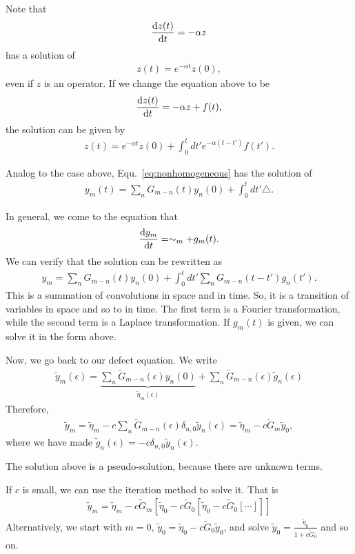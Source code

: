 Note that 
\begin{align}
\frac{{\mathrm d} {z(t)}}{{\mathrm d}t}=-\alpha z
\end{align}
has a solution of 
\begin{align}
z(t)= e^{-\alpha t}z(0),
\end{align}
even if $ z $ is an operator. If we change the equation above to be
\begin{align}
\frac{{\mathrm d} {z(t)}}{{\mathrm d}t}=-\alpha z +f(t),
\end{align}
the solution can be given by
\begin{align}
z(t)= e^{-\alpha t}z(0) +\int_0^t dt' e^{-\alpha (t-t')} f(t').
\end{align}

Analog to the case above, Equ.~\ref{eq:nonhomogeneous} has the solution of
\begin{align}
y_m(t)= \sum_n G_{m-n}(t)y_n (0) + \int_0^t dt' \triangle .
\end{align}

In general, we come to the equation that
\begin{align}
\frac{{\mathrm d} {y_m}}{{\mathrm d}t} = \sim_m +g_m (t).
\end{align}
We can verify that the solution can be rewritten as
\begin{align}
y_m =\sum_n G_{m-n}(t) y_n(0) + \int_0^t dt' \sum_n G_{m-n}(t-t') g_n (t'). 
\end{align}
This is a summation of convolutions in space and in time. So, it is a transition of variables in space and so to in time. The first term is a Fourier transformation, while the second term is a Laplace transformation. 
If $ g_m (t) $ is given, we can solve it in the form above. 

Now, we go back to our defect equation. We write
\begin{align}
\tilde{y}_m (\epsilon)= \underbrace{\sum_{n} \tilde{G} _{m-n }(\epsilon) y_n (0)}_{\tilde{\eta}_m(\epsilon)} + \sum_n \tilde{G}_{m-n}(\epsilon) \tilde{g}_n(\epsilon)
\end{align}
Therefore,
\begin{align}
\tilde{y}_m= \tilde{\eta}_m -c \sum_n \tilde{G}_{m-n}(\epsilon) \delta_{n,0} \tilde{y}_n (\epsilon)=\tilde{\eta}_m-c\tilde{G}_m\tilde{y}_0,
\end{align}
where we have made $ \tilde{g}_n(\epsilon)=-c\delta_{n,0}\tilde{y}_n(\epsilon) $.

The solution above is a pseudo-solution, because there are unknown terms. 

If $ c $ is small, we can use the iteration method to solve it. That is
\begin{align}
\tilde{y}_m=\tilde{\eta}_m-c\tilde{G}_m[\tilde{\eta}_0-c\tilde{G}_0[\tilde{\eta}_0-c\tilde{G}_0[\cdots]]]
\end{align}
Alternatively, we start with $ m=0 $, $\tilde{y}_0=\tilde{\eta}_0-c\tilde{G}_0\tilde{y}_0  $, and solve $ \tilde{y}_0=\frac{\tilde{\eta}_0}{1+c\tilde{G}_0} $ and so on. 

